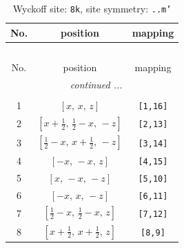 \documentclass[fleqn,8pt]{jsarticle}
\begin{document}
\begin{longtable}{ccc}
\caption{Wyckoff site: {\tt 8k}, site symmetry: {\tt ..m'}}
 \\
 \hline \hline
No. & position & mapping \\ \hline \endfirsthead

\multicolumn{2}{l}{\tablename\ \thetable{}} \\
 \hline \hline
No. & position & mapping \\ \hline \endhead

 \hline \hline
\multicolumn{2}{r}{\footnotesize\it continued ...} \\ \endfoot

 \hline \hline
\multicolumn{2}{r}{} \\ \endlastfoot

1 & $\left[ x,\, x,\, z \right]$ & {\tt [1,16]} \\ \hline
2 & $\left[ x + \frac{1}{2},\, \frac{1}{2} - x,\, - z \right]$ & {\tt [2,13]} \\ \hline
3 & $\left[ \frac{1}{2} - x,\, x + \frac{1}{2},\, - z \right]$ & {\tt [3,14]} \\ \hline
4 & $\left[ - x,\, - x,\, z \right]$ & {\tt [4,15]} \\ \hline
5 & $\left[ x,\, - x,\, - z \right]$ & {\tt [5,10]} \\ \hline
6 & $\left[ - x,\, x,\, - z \right]$ & {\tt [6,11]} \\ \hline
7 & $\left[ \frac{1}{2} - x,\, \frac{1}{2} - x,\, z \right]$ & {\tt [7,12]} \\ \hline
8 & $\left[ x + \frac{1}{2},\, x + \frac{1}{2},\, z \right]$ & {\tt [8,9]} \\
\end{longtable}
\renewcommand{\arraystretch}{1.2}
\end{document}

